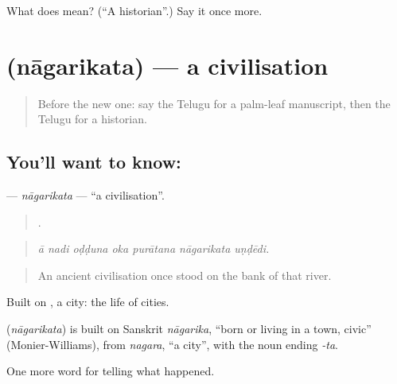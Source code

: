 \begin{tcolorbox}[breakable,colback=teal!4,colframe=teal!35!black,title={Before you move on}]
What does  mean? (\textquotedblleft{}A historian\textquotedblright{}.) Say it once more.
\end{tcolorbox}
\section[\texorpdfstring{\te{నాగరికత} (nāgarikata)}{నాగరికత (nāgarikata)}]{ (nāgarikata) — a civilisation}

\label{lesson:TE-C368-nagarikata}



\begin{quote}
Before the new one: say the Telugu for a palm-leaf manuscript, then the Telugu for a historian.
\end{quote}

\subsection*{You'll want to know: }
\textbf{} — \emph{nāgarikata} — \textquotedblleft{}a civilisation\textquotedblright{}.

\begin{quote}
      .
\end{quote}

\begin{quote}
\emph{ā nadi oḍḍuna oka purātana nāgarikata uṇḍēdi.}
\end{quote}

\begin{quote}
An ancient civilisation once stood on the bank of that river.
\end{quote}

Built on , a city: the life of cities.

\begin{cousinweb}
\textbf{} (\emph{nāgarikata}) is built on Sanskrit \emph{nāgarika}, \textquotedblleft{}born or living in a town, civic\textquotedblright{} (Monier-Williams), from \emph{nagara}, \textquotedblleft{}a city\textquotedblright{}, with the noun ending \emph{-ta}.
\end{cousinweb}

\begin{grammarlens}[title={What you've built}]
One more word for telling what happened.
\end{grammarlens}

